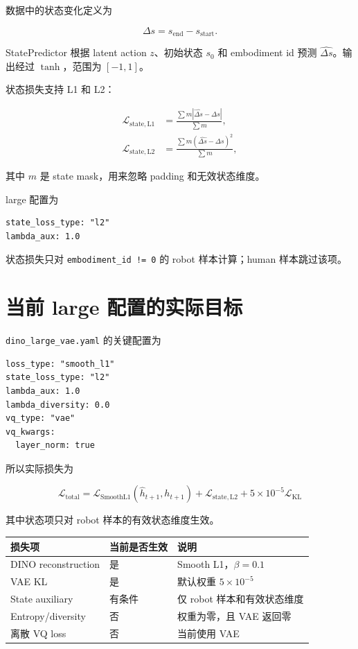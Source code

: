 \documentclass[UTF8,a4paper,11pt]{ctexart}
\begin{document}
数据中的状态变化定义为

\begin{equation*}
\Delta s=s_{\mathrm{end}}-s_{\mathrm{start}}.
\end{equation*}

StatePredictor 根据 latent action $z$、初始状态 $s_0$ 和 embodiment id 预测 $\widehat{\Delta s}$。输出经过 $\tanh$，范围为 $[-1,1]$。

状态损失支持 L1 和 L2：

\begin{align*}
\mathcal{L}_{\mathrm{state,L1}}
&=\frac{\sum m|\widehat{\Delta s}-\Delta s|}{\sum m},\\
\mathcal{L}_{\mathrm{state,L2}}
&=\frac{\sum m(\widehat{\Delta s}-\Delta s)^2}{\sum m},
\end{align*}

其中 $m$ 是 state mask，用来忽略 padding 和无效状态维度。

large 配置为

\begin{verbatim}
state_loss_type: "l2"
lambda_aux: 1.0
\end{verbatim}

状态损失只对 \texttt{embodiment\_id != 0} 的 robot 样本计算；human 样本跳过该项。

\section{当前 large 配置的实际目标}

\texttt{dino\_large\_vae.yaml} 的关键配置为

\begin{verbatim}
loss_type: "smooth_l1"
state_loss_type: "l2"
lambda_aux: 1.0
lambda_diversity: 0.0
vq_type: "vae"
vq_kwargs:
  layer_norm: true
\end{verbatim}

所以实际损失为

\begin{equation}
\boxed{
\mathcal{L}_{\mathrm{total}}
=\mathcal{L}_{\mathrm{SmoothL1}}(\widehat{h}_{t+1},h_{t+1})
+\mathcal{L}_{\mathrm{state,L2}}
+5\times10^{-5}\mathcal{L}_{\mathrm{KL}}
}
\end{equation}

其中状态项只对 robot 样本的有效状态维度生效。

\begin{center}
\begin{tabular}{lll}
\toprule
损失项 & 当前是否生效 & 说明 \\
\midrule
DINO reconstruction & 是 & Smooth L1，$\beta=0.1$ \\
VAE KL & 是 & 默认权重 $5\times10^{-5}$ \\
State auxiliary & 有条件 & 仅 robot 样本和有效状态维度 \\
Entropy/diversity & 否 & 权重为零，且 VAE 返回零 \\
离散 VQ loss & 否 & 当前使用 VAE \\
\bottomrule
\end{tabular}
\end{center}
\end{document}
